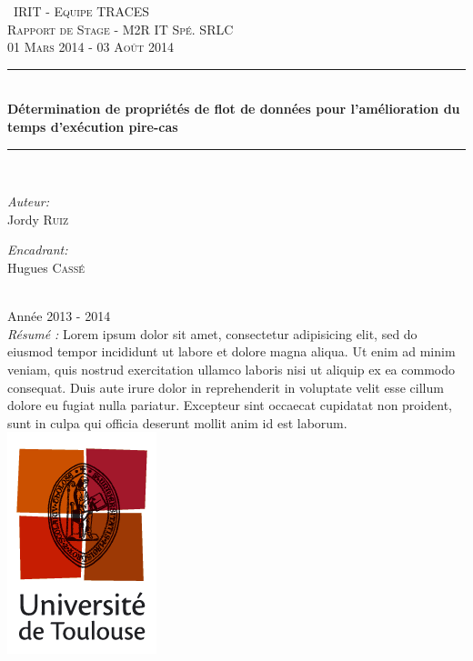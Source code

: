 \documentclass[french]{article}
\begin{document}
  \begin{titlepage}
  \newcommand{\HRule}{\rule{\linewidth}{0.5mm}}
  \center
  \textsc{\	 IRIT - Equipe TRACES}\\[0.4cm]
  \textsc{\Large Rapport de Stage - M2R IT Spé. SRLC}\\[0.4cm]
  \textsc{\large 01 Mars 2014 - 03 Août 2014}
  \HRule \\[0.5cm] { \huge \bfseries Détermination de propriétés de flot de données pour l'amélioration du temps d'exécution
pire-cas}\\[0.4cm] \HRule \\[0.5cm]
  \begin{minipage}{0.5\textwidth} \begin{flushleft} \large \emph{Auteur:}\\ Jordy \textsc{Ruiz} \end{flushleft} \end{minipage}\begin{minipage}{0.5\textwidth} \begin{flushright} \large \emph{Encadrant:} \\ Hugues \textsc{Cassé}\end{flushright} \end{minipage}\\[0.5cm]
  {\large Année 2013 - 2014}\\[1cm]
  
  {\large \textit{Résumé :} Lorem ipsum dolor sit amet, consectetur adipisicing elit, sed do eiusmod tempor incididunt ut labore et dolore magna aliqua. Ut enim ad minim veniam, quis nostrud exercitation ullamco laboris nisi ut aliquip ex ea commodo consequat. Duis aute irure dolor in reprehenderit in voluptate velit esse cillum dolore eu fugiat nulla pariatur. Excepteur sint occaecat cupidatat non proident, sunt in culpa qui officia deserunt mollit anim id est laborum.} \\[1cm]
  \includegraphics[scale=0.6]{pictures/logo_univ_tlse.png}\\[1cm]
  \vfill
  \end{titlepage}
\end{document}
